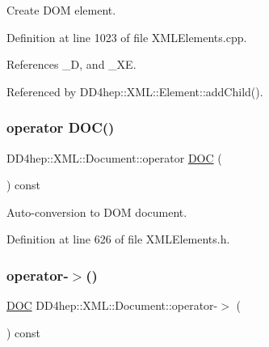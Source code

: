 Create D\+OM element. 



Definition at line 1023 of file X\+M\+L\+Elements.\+cpp.



References \+\_\+D, and \+\_\+\+XE.



Referenced by D\+D4hep\+::\+X\+M\+L\+::\+Element\+::add\+Child().

\hypertarget{class_d_d4hep_1_1_x_m_l_1_1_document_ae1d75c03ff7d6a023f7d4b31f76dd8ab}{}\label{class_d_d4hep_1_1_x_m_l_1_1_document_ae1d75c03ff7d6a023f7d4b31f76dd8ab} 
\subsubsection{\texorpdfstring{operator D\+O\+C()}{operator DOC()}}
{\footnotesize\ttfamily D\+D4hep\+::\+X\+M\+L\+::\+Document\+::operator \hyperlink{class_d_d4hep_1_1_x_m_l_1_1_document_a685ff83de83e9b7b37e79ad846fc2387}{D\+OC} (\begin{DoxyParamCaption}{ }\end{DoxyParamCaption}) const\hspace{0.3cm}{\ttfamily [inline]}}



Auto-\/conversion to D\+OM document. 



Definition at line 626 of file X\+M\+L\+Elements.\+h.

\hypertarget{class_d_d4hep_1_1_x_m_l_1_1_document_a20800bb9f49130d545fb32c7cee7f011}{}\label{class_d_d4hep_1_1_x_m_l_1_1_document_a20800bb9f49130d545fb32c7cee7f011} 
\subsubsection{\texorpdfstring{operator-\/$>$()}{operator->()}}
{\footnotesize\ttfamily \hyperlink{class_d_d4hep_1_1_x_m_l_1_1_document_a685ff83de83e9b7b37e79ad846fc2387}{D\+OC} D\+D4hep\+::\+X\+M\+L\+::\+Document\+::operator-\/$>$ (\begin{DoxyParamCaption}{ }\end{DoxyParamCaption}) const\hspace{0.3cm}{\ttfamily [inline]}}



